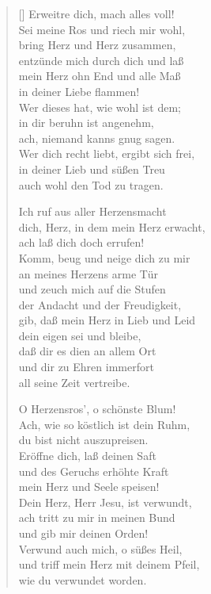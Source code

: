 \begin{multicols}{2}
\begin{verse}[\versewidth]
 Erweitre dich, mach alles voll!\\
Sei meine Ros und riech mir wohl,\\
bring Herz und Herz zusammen,\\
entzünde mich durch dich und laß\\
mein Herz ohn End und alle Maß\\
in deiner Liebe flammen!\\
Wer dieses hat, wie wohl ist dem;\\
in dir beruhn ist angenehm,\\
ach, niemand kanns gnug sagen.\\
Wer dich recht liebt, ergibt sich frei,\\
in deiner Lieb und süßen Treu\\
auch wohl den Tod zu tragen.

 Ich ruf aus aller Herzensmacht\\
dich, Herz, in dem mein Herz erwacht,\\
ach laß dich doch errufen!\\
Komm, beug und neige dich zu mir\\
an meines Herzens arme Tür\\
und zeuch mich auf die Stufen\\
der Andacht und der Freudigkeit,\\
gib, daß mein Herz in Lieb und Leid\\
dein eigen sei und bleibe,\\
daß dir es dien an allem Ort\\
und dir zu Ehren immerfort\\
all seine Zeit vertreibe.

 O Herzensros', o schönste Blum!\\
Ach, wie so köstlich ist dein Ruhm,\\
du bist nicht auszupreisen.\\
Eröffne dich, laß deinen Saft\\
und des Geruchs erhöhte Kraft\\
mein Herz und Seele speisen!\\
Dein Herz, Herr Jesu, ist verwundt,\\
ach tritt zu mir in meinen Bund\\
und gib mir deinen Orden!\\
Verwund auch mich, o süßes Heil,\\
und triff mein Herz mit deinem Pfeil,\\
wie du verwundet worden.

\end{verse}
\end{multicols}

